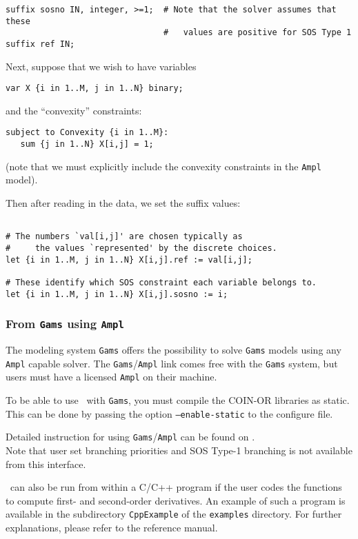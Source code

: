 \begin{verbatim}
suffix sosno IN, integer, >=1;  # Note that the solver assumes that these
                                #   values are positive for SOS Type 1
suffix ref IN;
\end{verbatim}

Next, suppose that we wish to have variables
\begin{verbatim}
var X {i in 1..M, j in 1..N} binary;
\end{verbatim}
and the ``convexity'' constraints:

\begin{verbatim}
subject to Convexity {i in 1..M}:
   sum {j in 1..N} X[i,j] = 1;
\end{verbatim}
(note that we must explicitly include the convexity constraints in the {\tt Ampl} model).

Then after reading in the data, we set the suffix values:
\begin{verbatim}

# The numbers `val[i,j]' are chosen typically as
#     the values `represented' by the discrete choices.
let {i in 1..M, j in 1..N} X[i,j].ref := val[i,j];

# These identify which SOS constraint each variable belongs to.
let {i in 1..M, j in 1..N} X[i,j].sosno := i;
\end{verbatim}

\subsubsection{From {\tt Gams} using {\tt Ampl}}
The modeling system {\tt Gams} offers the possibility to solve {\tt Gams} models using any
{\tt Ampl} capable solver. The {\tt Gams}/{\tt Ampl} link comes free with the {\tt Gams}
system, but users must have a licensed {\tt Ampl} on their machine.

To be able to use \Bonmin\ with {\tt Gams}, you must compile the COIN-OR libraries as static.
This can be done by passing the option {\tt --enable-static} to the configure file.

Detailed instruction for using {\tt Gams}/{\tt Ampl} can be found
on .\\

Note that user set branching priorities and SOS Type-1 branching is not
available from this interface.

\Bonmin\ can also be run from within a C/C++ program if the user codes
the functions to compute first- and second-order derivatives.
An example of such a program is available in the subdirectory {\tt CppExample} of
the {\tt examples} directory. For further explanations, please refer to the reference manual.
